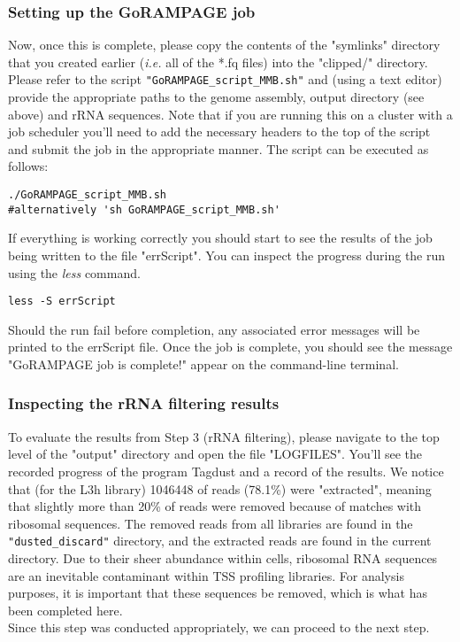 \documentclass[runningheads,a4paper]{llncs}
\begin{document}
\begin{linenumbers}
\begin{itemize}
\subsubsection{Setting up the GoRAMPAGE job}

Now, once this is complete, please copy the contents of the "symlinks" directory that you created earlier (\textit{i.e.} all of the *.fq files) into the "clipped/" directory.
Please refer to the script \texttt{"GoRAMPAGE\_script\_MMB.sh"} and (using a text editor) provide the appropriate paths to the genome assembly, output directory (see above) and rRNA sequences. 
Note that if you are running this on a cluster with a job scheduler you'll need to add the necessary headers to the top of the script and submit the job in the appropriate manner.
The script can be executed as follows:

\noindent
\begin{verbatim}
./GoRAMPAGE_script_MMB.sh
#alternatively 'sh GoRAMPAGE_script_MMB.sh'
\end{verbatim}

If everything is working correctly you should start to see the results of the job being written to the file "errScript".
You can inspect the progress during the run using the \textit{less} command. 

\noindent
\begin{verbatim}
less -S errScript
\end{verbatim}

Should the run fail before completion, any associated error messages will be printed to the errScript file. Once the job is complete, you should see the message "GoRAMPAGE job is complete!" appear on the command-line terminal.

\subsubsection{Inspecting the rRNA filtering results}

To evaluate the results from Step 3 (rRNA filtering), please navigate to the top level of the "output" directory and open the file "LOGFILES".
You'll see the recorded progress of the program Tagdust and a record of the results.
We notice that (for the L3h library) 1046448 of reads (78.1\%) were "extracted", meaning that slightly more than 20\% of reads were removed because of matches with ribosomal sequences.
The removed reads from all libraries are found in the \texttt{"dusted\_discard"} directory, and the extracted reads are found in the current directory. 
Due to their sheer abundance within cells, ribosomal RNA sequences are an inevitable contaminant within TSS profiling libraries. 
For analysis purposes, it is important that these sequences be removed, which is what has been completed here.\\
Since this step was conducted appropriately, we can proceed to the next step.


\end{itemize}
\end{linenumbers}
\end{document}
